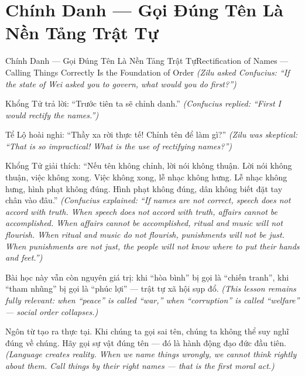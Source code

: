 \section{Chính Danh — Gọi Đúng Tên Là Nền Tảng Trật Tự}
\begin{truyen}{Chính Danh — Gọi Đúng Tên Là Nền Tảng Trật Tự}{Rectification of Names — Calling Things Correctly Is the Foundation of Order}
\textit{(Zilu asked Confucius: ``If the state of Wei asked you to govern, what would you do first?'')}

Khổng Tử trả lời: ``Trước tiên ta sẽ chỉnh danh.''
\textit{(Confucius replied: ``First I would rectify the names.'')}

Tể Lộ hoài nghi: ``Thầy xa rời thực tế! Chỉnh tên để làm gì?''
\textit{(Zilu was skeptical: ``That is so impractical! What is the use of rectifying names?'')}

Khổng Tử giải thích: ``Nếu tên không chỉnh, lời nói không thuận. Lời nói không thuận, việc không xong. Việc không xong, lễ nhạc không hưng. Lễ nhạc không hưng, hình phạt không đúng. Hình phạt không đúng, dân không biết đặt tay chân vào đâu.''
\textit{(Confucius explained: ``If names are not correct, speech does not accord with truth. When speech does not accord with truth, affairs cannot be accomplished. When affairs cannot be accomplished, ritual and music will not flourish. When ritual and music do not flourish, punishments will not be just. When punishments are not just, the people will not know where to put their hands and feet.'')}

Bài học này vẫn còn nguyên giá trị: khi ``hòa bình'' bị gọi là ``chiến tranh'', khi ``tham nhũng'' bị gọi là ``phúc lợi'' — trật tự xã hội sụp đổ.
\textit{(This lesson remains fully relevant: when ``peace'' is called ``war,'' when ``corruption'' is called ``welfare'' — social order collapses.)}

\end{truyen}

\begin{baihoc}
Ngôn từ tạo ra thực tại. Khi chúng ta gọi sai tên, chúng ta không thể suy nghĩ đúng về chúng. Hãy gọi sự vật đúng tên — đó là hành động đạo đức đầu tiên.
\textit{(Language creates reality. When we name things wrongly, we cannot think rightly about them. Call things by their right names — that is the first moral act.)}
\end{baihoc}
\ngancach

